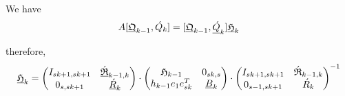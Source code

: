 \documentclass{scrartcl}
\begin{document}
We have
\begin{eqnarray*}
	A [\underline{\frak{Q}}_{k - 1}, \acute{Q}_k] = [ \underline{\frak{Q}}_{k - 1}, \underline{\acute{Q}}_k ] \underline{\frak{H}}_k
\end{eqnarray*}

therefore,
\begin{eqnarray*}
	\underline{\frak{H}}_k = 
	\begin{pmatrix}
		I_{sk + 1, sk + 1} & \underline{\acute{\frak{R}}}_{k - 1, k} \\
		0_{s, sk + 1} & \underline{\acute{R}}_k \\
	\end{pmatrix} \cdot
	\begin{pmatrix}
		\frak{H}_{k - 1} & 0_{sk, s} \\
		h_{k - 1} e_1 e^T_{sk} & \underline{B}_k \\
	\end{pmatrix} \cdot
	\begin{pmatrix}
		I_{sk + 1, sk + 1} & \acute{\frak{R}}_{k - 1, k} \\
		0_{s - 1, sk + 1} &\acute{R}_k \\
	\end{pmatrix}^{-1}
\end{eqnarray*}

\end{document}
